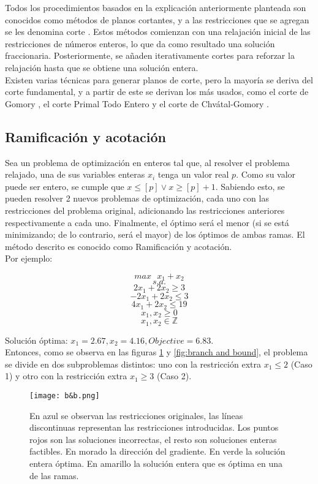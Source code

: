 \documentclass[12pt]{report}
\begin{document}
Todos los procedimientos basados en la explicación anteriormente planteada son conocidos como métodos de planos cortantes, y a las restricciones que se agregan se les denomina corte \cite{Williams}. Estos métodos comienzan con una relajación inicial de las restricciones de números enteros, lo que da como resultado una solución fraccionaria. Posteriormente, se añaden iterativamente cortes para reforzar la relajación hasta que se obtiene una solución entera.\\

Existen varias técnicas para generar planos de corte, pero la mayoría se deriva del corte fundamental, y a partir de este se derivan los más usados, como el corte de Gomory \cite{Gomory}, el corte Primal Todo Entero \cite{PTE} y el corte  de Chvátal-Gomory \cite{Chvátal}.\\


\subsection{Ramificación y acotación}

Sea un problema de optimización en enteros tal que, al resolver el problema relajado, una de sus variables enteras $x_i$ tenga un valor real $p$. Como su valor puede ser entero, se cumple que $x \leq  [p] \lor  x \geq  [p]+1$. Sabiendo esto, se pueden resolver 2 nuevos problemas de optimización, cada uno con las restricciones del problema original, adicionando las restricciones anteriores respectivamente a cada uno. Finalmente, el óptimo será el menor (si se está minimizando; de lo contrario, será el mayor) de los óptimos de ambas ramas. El método descrito es conocido como Ramificación y acotación.\cite{Williams} \\

Por ejemplo:

$$max \text{ } x_1 + x_2$$
$$s.a.$$
$$2x_1 + 2x_2 \geq  3$$
$$-2x_1 + 2x_2 \leq  3$$
$$4x_1 + 2x_2 \leq  19$$
$$x_1, x_2 \geq  0$$
$$x_1, x_2 \in \mathbb{Z}$$

Solución óptima: $x_1=2.67, x_2=4.16, Objective=6.83$.\\

Entonces, como se observa en las figuras \ref{fig:b&b} y \ref{fig:branch and bound}, el problema se divide en dos subproblemas distintos: uno con la restricción extra $x_1\leq 2$ (Caso 1) y otro con la restricción extra $x_1\geq 3$ (Caso 2).\\

\begin{figure}[ht]
    \centering
    \texttt{[image: b\&b.png]}
    \caption{En azul se observan las restricciones originales, las líneas discontinuas representan las restricciones introducidas. Los puntos rojos son las soluciones incorrectas, el resto son soluciones enteras factibles. En morado la dirección del gradiente. En verde la solución entera óptima. En amarillo la solución entera que es óptima en una de las ramas.}
    \label{fig:b&b}
\end{figure}
\end{document}
